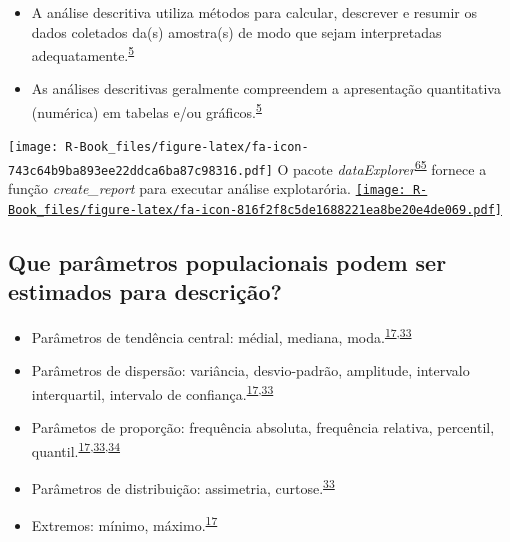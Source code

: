 \documentclass[
]{book}
\begin{document}
\begin{itemize}
\item
  A análise descritiva utiliza métodos para calcular, descrever e resumir os dados coletados da(s) amostra(s) de modo que sejam interpretadas adequatamente.\textsuperscript{\protect\hyperlink{ref-vetter2017}{5}}
\item
  As análises descritivas geralmente compreendem a apresentação quantitativa (numérica) em tabelas e/ou gráficos.\textsuperscript{\protect\hyperlink{ref-vetter2017}{5}}
\end{itemize}

\texttt{[image: R-Book\_files/figure-latex/fa-icon-743c64b9ba893ee22ddca6ba87c98316.pdf]} O pacote \emph{dataExplorer}\textsuperscript{\protect\hyperlink{ref-DataExplorer}{65}} fornece a função \emph{create\_report} para executar análise explotarória. \href{https://cran.r-project.org/web/packages/DataExplorer/index.html}{\texttt{[image: R-Book\_files/figure-latex/fa-icon-816f2f8c5de1688221ea8be20e4de069.pdf]}}

\hypertarget{que-paruxe2metros-populacionais-podem-ser-estimados-para-descriuxe7uxe3o}{%
\subsection{Que parâmetros populacionais podem ser estimados para descrição?}\label{que-paruxe2metros-populacionais-podem-ser-estimados-para-descriuxe7uxe3o}}

\begin{itemize}
\item
  Parâmetros de tendência central: médial, mediana, moda.\textsuperscript{\protect\hyperlink{ref-Ali2016}{17},\protect\hyperlink{ref-kanji2006}{33}}
\item
  Parâmetros de dispersão: variância, desvio-padrão, amplitude, intervalo interquartil, intervalo de confiança.\textsuperscript{\protect\hyperlink{ref-Ali2016}{17},\protect\hyperlink{ref-kanji2006}{33}}
\item
  Parâmetos de proporção: frequência absoluta, frequência relativa, percentil, quantil.\textsuperscript{\protect\hyperlink{ref-Ali2016}{17},\protect\hyperlink{ref-kanji2006}{33},\protect\hyperlink{ref-Altman1994}{34}}
\item
  Parâmetros de distribuição: assimetria, curtose.\textsuperscript{\protect\hyperlink{ref-kanji2006}{33}}
\item
  Extremos: mínimo, máximo.\textsuperscript{\protect\hyperlink{ref-Ali2016}{17}}
\end{itemize}
\end{document}
